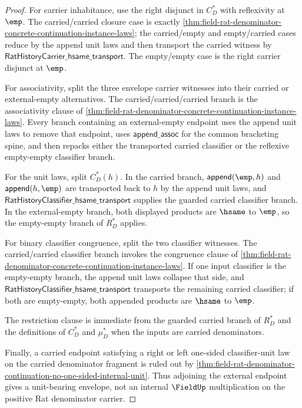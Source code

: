 \begin{proof}
For carrier inhabitance, use the right disjunct in $C_D^\ast$ with reflexivity
at $\emp$. The carried/carried closure case is exactly
\autoref{thm:field-rat-denominator-concrete-continuation-instance-laws}; the
carried/empty and empty/carried cases reduce by the append unit laws and then
transport the carried witness by
$\mathsf{RatHistoryCarrier\_hsame\_transport}$. The empty/empty case is the
right carrier disjunct at $\emp$.

For associativity, split the three envelope carrier witnesses into their carried
or external-empty alternatives. The carried/carried/carried branch is the
associativity clause of
\autoref{thm:field-rat-denominator-concrete-continuation-instance-laws}. Every
branch containing an external-empty endpoint uses the append unit laws to remove
that endpoint, uses $\mathsf{append\_assoc}$ for the common bracketing spine,
and then repacks either the transported carried classifier or the reflexive
empty-empty classifier branch.

For the unit laws, split $C_D^\ast(h)$. In the carried branch,
$\mathsf{append}(\emp,h)$ and $\mathsf{append}(h,\emp)$ are transported back to
$h$ by the append unit laws, and
$\mathsf{RatHistoryClassifier\_hsame\_transport}$ supplies the guarded carried
classifier branch. In the external-empty branch, both displayed products are
$\hsame$ to $\emp$, so the empty-empty branch of $R_D^\ast$ applies.

For binary classifier congruence, split the two classifier witnesses. The
carried/carried classifier branch invokes the congruence clause of
\autoref{thm:field-rat-denominator-concrete-continuation-instance-laws}. If one
input classifier is the empty-empty branch, the append unit laws collapse that
side, and $\mathsf{RatHistoryClassifier\_hsame\_transport}$ transports the
remaining carried classifier; if both are empty-empty, both appended products
are $\hsame$ to $\emp$.

The restriction clause is immediate from the guarded carried branch of
$R_D^\ast$ and the definitions of $C_D^\ast$ and $\mu_D^\ast$ when the inputs
are carried denominators.

Finally, a carried endpoint satisfying a right or left one-sided classifier-unit
law on the carried denominator fragment is ruled out by
\autoref{thm:field-rat-denominator-continuation-no-one-sided-internal-unit}.
Thus adjoining the external endpoint gives a unit-bearing envelope, not an
internal $\FieldUp$ multiplication on the positive Rat denominator carrier.
\end{proof}


